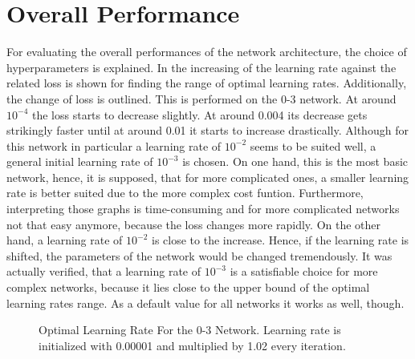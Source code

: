 \section{Overall Performance}
\label{sec:results-overall}
For evaluating the overall performances of the network architecture, the choice of hyperparameters is explained.
In  the increasing of the learning rate against the related loss is shown for finding the range of optimal learning rates.
Additionally, the change of loss is outlined.
This is performed on the 0-3 network.
At around $10^{-4}$ the loss starts to decrease slightly.
At around 0.004 its decrease gets strikingly faster until at around 0.01 it starts to increase drastically.
Although for this network in particular a learning rate of $10^{-2}$ seems to be suited well, a general initial learning rate of $10^{-3}$ is chosen.
On one hand, this is the most basic network, hence, it is supposed, that for more complicated ones, a smaller learning rate is better suited due to the more complex cost funtion.
Furthermore, interpreting those graphs is time-consuming and for more complicated networks not that easy anymore, because the loss changes more rapidly.
On the other hand, a learning rate of $10^{-2}$ is close to the increase.
Hence, if the learning rate is shifted, the parameters of the network would be changed tremendously.
It was actually verified, that a learning rate of $10^{-3}$ is a satisfiable choice for more complex networks, because it lies close to the upper bound of the optimal learning rates range.
As a default value for all networks it works as well, though.
\begin{figure}
	\setlength{}
	\setlength{}
	\centering
	\begin{subfigure}{.5\textwidth}
		\centering
		
	\end{subfigure}%
	\begin{subfigure}{.5\textwidth}
		\centering
		
	\end{subfigure}
	\caption[Optimal Learning Rate For the 0-3 Network]{Optimal Learning Rate For the 0-3 Network. Learning rate is initialized with 0.00001 and multiplied by 1.02 every iteration.}
	\label{fig:optimal-learning-rate}
\end{figure}

